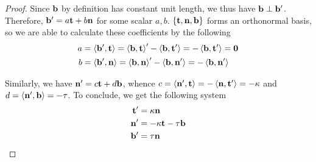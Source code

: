 \begin{proof}
	Since $\mathbf{b}$ by definition has constant unit length, we thus have $\mathbf{b} \perp \mathbf{b}'$. Therefore, $\mathbf{b}' = a\mathbf{t} + b\mathbf{n}$ for some scalar $a, b$. $\{\mathbf{t}, \mathbf{n}, \mathbf{b} \}$ forms an orthonormal basis, so we are able to calculate these coefficients by the following
	\begin{align*}
	a &= \left< \mathbf{b}', \mathbf{t} \right> = \left< \mathbf{b}, \mathbf{t} \right>' - \left< \mathbf{b}, \mathbf{t}' \right> = -\left< \mathbf{b}, \mathbf{t}' \right> = \mathbf{0}\\
	b &= \left< \mathbf{b}', \mathbf{n} \right> = \left< \mathbf{b}, \mathbf{n} \right>' - \left< \mathbf{b}, \mathbf{n}' \right> = -\left< \mathbf{b}, \mathbf{n}' \right>
	\end{align*}
	
	Similarly, we have $\mathbf{n}' = c\mathbf{t} + d\mathbf{b}$, whence $c = \left< \mathbf{n}', \mathbf{t} \right> = -\left< \mathbf{n}, \mathbf{t}' \right> = -\kappa$ and $d = \left< \mathbf{n}', \mathbf{b} \right> = -\tau$. To conclude, we get the following system
	\begin{align*}
	\mathbf{t}' &= \kappa \mathbf{n}\\
	\mathbf{n}' &= -\kappa \mathbf{t} - \tau \mathbf{b}\\
	\mathbf{b}' &= \tau \mathbf{n}
	\end{align*}
\end{proof}

